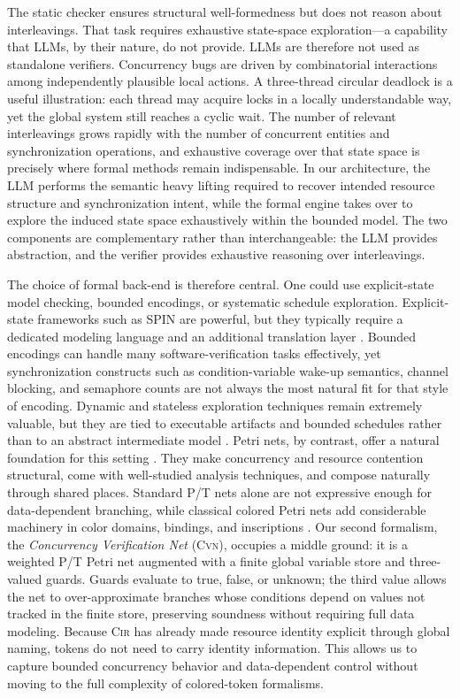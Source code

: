 \documentclass[sigconf]{acmart}
\begin{document}
The static checker ensures structural well-formedness but does not reason about interleavings. That task requires exhaustive state-space exploration—a capability that LLMs, by their nature, do not provide. LLMs are therefore not used as standalone verifiers. Concurrency bugs are driven by combinatorial interactions among independently plausible local actions. A three-thread circular deadlock is a useful illustration: each thread may acquire locks in a locally understandable way, yet the global system still reaches a cyclic wait. The number of relevant interleavings grows rapidly with the number of concurrent entities and synchronization operations, and exhaustive coverage over that state space is precisely where formal methods remain indispensable. In our architecture, the LLM performs the semantic heavy lifting required to recover intended resource structure and synchronization intent, while the formal engine takes over to explore the induced state space exhaustively within the bounded model. The two components are complementary rather than interchangeable: the LLM provides abstraction, and the verifier provides exhaustive reasoning over interleavings.


The choice of formal back-end is therefore central. One could use explicit-state model checking, bounded encodings, or systematic schedule exploration. Explicit-state frameworks such as SPIN are powerful, but they typically require a dedicated modeling language and an additional translation layer \cite{Holzmann1997SPIN}. Bounded encodings can handle many software-verification tasks effectively, yet synchronization constructs such as condition-variable wake-up semantics, channel blocking, and semaphore counts are not always the most natural fit for that style of encoding. Dynamic and stateless exploration techniques remain extremely valuable, but they are tied to executable artifacts and bounded schedules rather than to an abstract intermediate model \cite{Godefroid1997VeriSoft,Flanagan2005DPOR,Musuvathi2008FairStateless}. Petri nets, by contrast, offer a natural foundation for this setting \cite{Murata1989PetriNets,Esparza2008Unfoldings}. They make concurrency and resource contention structural, come with well-studied analysis techniques, and compose naturally through shared places. Standard P/T nets alone are not expressive enough for data-dependent branching, while classical colored Petri nets add considerable machinery in color domains, bindings, and inscriptions \cite{Jensen2007CPNTools}. Our second formalism, the \emph{Concurrency Verification Net} (\textsc{Cvn}), occupies a middle ground: it is a weighted P/T Petri net augmented with a finite global variable store and three-valued guards. Guards evaluate to true, false, or unknown; the third value allows the net to over-approximate branches whose conditions depend on values not tracked in the finite store, preserving soundness without requiring full data modeling. Because \textsc{Cir} has already made resource identity explicit through global naming, tokens do not need to carry identity information. This allows us to capture bounded concurrency behavior and data-dependent control without moving to the full complexity of colored-token formalisms.
\end{document}
